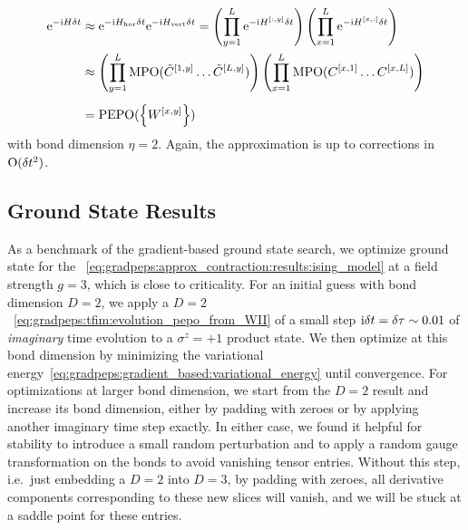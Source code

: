 \begin{align}
\begin{split}
    \label{eq:gradpeps:tfim:evolution_pepo_from_WII}
    \eto{-\im H \delta t}
    &\approx 
    \eto{-\im H_\text{hor} \delta t} \eto{-\im H_\text{vert} \delta t}
    =
    \rBr{\prod_{y=1}^L \eto{-\im H^{[:,y]} \delta t}} \rBr{\prod_{x=1}^L \eto{-\im H^{[x,:]} \delta t}}
    \\
    &\approx
    \rBr{\prod_{y=1}^L \mathrm{MPO}(\tilde{C}^{[1,y]} \dots \tilde{C}^{[L,y]}) }
    \rBr{\prod_{x=1}^L \mathrm{MPO}(C^{[x,1]} \dots C^{[x,L]}) }
    \\[1ex]
    &= \mathrm{PEPO}(\set{W^{[x,y]}})
\end{split}
\end{align}
with bond dimension $\eta = 2$.
%
Again, the approximation is up to corrections in $\mathrm{O}(\delta t^2)$.


\subsection{Ground State Results}

As a benchmark of the gradient-based ground state search, we optimize ground state  for the ~\eqref{eq:gradpeps:approx_contraction:results:ising_model} at a field strength $g=3$, which is close to criticality.
%
For an initial guess with bond dimension $D=2$, we apply a $D=2$ ~\eqref{eq:gradpeps:tfim:evolution_pepo_from_WII} of a small step $\mathrm{i}\delta t = \delta\tau \sim 0.01$ of \emph{imaginary} time evolution to a $\sigma^z=+1$ product state.
%
We then optimize at this bond dimension by minimizing the variational energy~\eqref{eq:gradpeps:gradient_based:variational_energy} until convergence.
%
For optimizations at larger  bond dimension, we start from the $D=2$ result and increase its bond dimension, either by padding with zeroes or by applying another imaginary time step exactly.
%
In either case, we found it helpful for stability to introduce a small random perturbation and to apply a random gauge transformation on the bonds to avoid vanishing tensor entries.
%
Without this step, i.e.~just embedding a $D=2$  into $D=3$, by padding with zeroes, all derivative components corresponding to these new slices will vanish, and we will be stuck at a saddle point for these entries.


